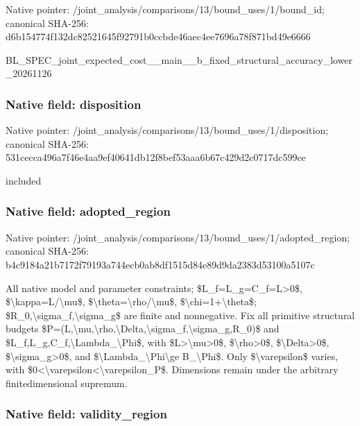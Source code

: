 \documentclass[10pt,a4paper]{article}
\begin{document}
Native pointer: /joint\_analysis/comparis\allowbreak{}ons/13/bound\_uses/1/boun\allowbreak{}d\_id; canonical SHA-256: d6b154774f132dc82521645f\allowbreak{}92791b0ccbde46aec4ee7696\allowbreak{}a78f871bd49e6666


BL\_SPEC\_joint\_expected\_c\allowbreak{}ost\_\_main\_\_b\_fixed\_struc\allowbreak{}tural\_accuracy\_lower\_202\allowbreak{}61126


\subsubsection{Native field: disposition}


Native pointer: /joint\_analysis/comparis\allowbreak{}ons/13/bound\_uses/1/disp\allowbreak{}osition; canonical SHA-256: 531cecca496a7f46e4aa9ef4\allowbreak{}0641db12f8bef53aaa6b67c4\allowbreak{}29d2c0717dc599ce


included


\subsubsection{Native field: adopted\_region}


Native pointer: /joint\_analysis/comparis\allowbreak{}ons/13/bound\_uses/1/adop\allowbreak{}ted\_region; canonical SHA-256: b4c9184a21b7172f79193a74\allowbreak{}4ecb0ab8df1515d84e89d9da\allowbreak{}2383d53100a5107c


All native model and parameter constraints; \$L\_f=L\_g=C\_f=L>0\$, \$\textbackslash{}kappa=L/\textbackslash{}mu\$, \$\textbackslash{}theta=\textbackslash{}rho/\textbackslash{}mu\$, \$\textbackslash{}chi=1+\textbackslash{}theta\$; \$R\_0,\textbackslash{}sigma\_f,\textbackslash{}sigma\_g\$ are finite and nonnegative. Fix all primitive structural budgets \$P=(L,\textbackslash{}mu,\textbackslash{}rho,\textbackslash{}Delta,\textbackslash{}s\allowbreak{}igma\_f,\textbackslash{}sigma\_g,R\_0)\$ and \$L\_f,L\_g,C\_f,\textbackslash{}Lambda\_\textbackslash{}Phi\$, with \$L>\textbackslash{}mu>0\$, \$\textbackslash{}rho>0\$, \$\textbackslash{}Delta>0\$, \$\textbackslash{}sigma\_g>0\$, and \$\textbackslash{}Lambda\_\textbackslash{}Phi\textbackslash{}ge B\_\textbackslash{}Phi\$. Only \$\textbackslash{}varepsilon\$ varies, with \$0<\textbackslash{}varepsilon<\textbackslash{}varepsilon\_P\$. Dimensions remain under the arbitrary finitedimensional supremum.


\subsubsection{Native field: validity\_region}
\end{document}
